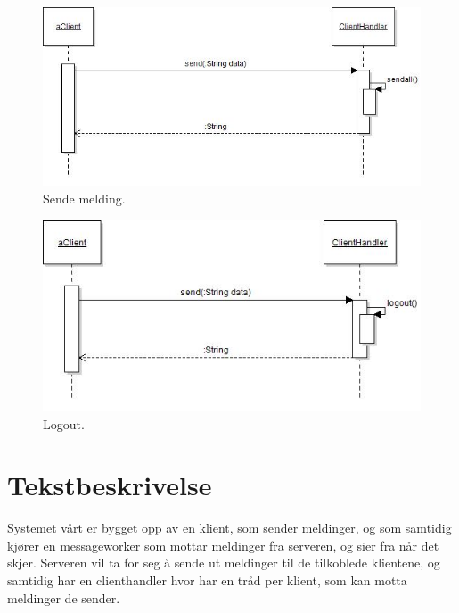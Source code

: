 \documentclass[a4paper]{article}
\begin{document}
\begin{figure}[ht]
\centering
\includegraphics[width=1.3\textwidth]{resources/msgSeq.jpg}
\caption{\label{fig:msgSeq}Sende melding.}
\end{figure}

\begin{figure}[ht]
\centering
\includegraphics[width=1.2\textwidth]{resources/logoutSeq.jpg}
\caption{\label{fig:logoutSeq}Logout.}
\end{figure}
\clearpage

\section*{Tekstbeskrivelse}

Systemet vårt er bygget opp av en klient, som sender meldinger, og som samtidig kjører en messageworker som mottar meldinger fra serveren, og sier fra når det skjer. Serveren vil ta for seg å sende ut meldinger til de tilkoblede klientene, og samtidig har en clienthandler hvor har en tråd per klient, som kan motta meldinger de sender.
\end{document}
